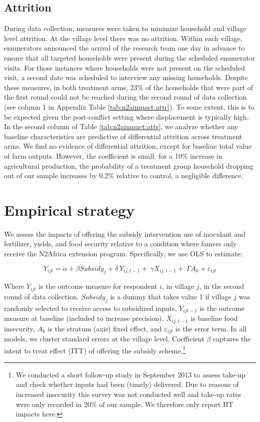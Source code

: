 \subsection{Attrition}
During data collection, measures were taken to minimize household and village level attrition. At the village level there was no attrition. Within each village, enumerators announced the arrival of the research team one day in advance to ensure that all targeted households were present during the scheduled enumerator visits. For those instances where households were not present on the scheduled visit, a second date was scheduled to interview any missing households. Despite these measures, in both treatment arms, 23\% of the households that were part of the first round could not be reached during the second round of data collection (see column 1 in Appendix Table \ref{tab:n2aimpact:attr}). To some extent, this is to be expected given the post-conflict setting where displacement is typically high. In the second column of Table \ref{tab:n2aimpact:attr}, we analyze whether any baseline characteristics are predictive of differential attrition across treatment arms. We find no evidence of differential attrition, except for baseline total value of farm outputs. However, the coefficient is small: for a 10\% increase in agricultural production, the probability of a treatment group household dropping out of our sample increases by 0.2\% relative to control, a negligible difference. 

\section{Empirical strategy} 
We assess the impacts of offering the subsidy intervention use of inoculant and fertilizer, yields, and food security relative to a condition where famers only receive the N2Africa extension program.  Specifically, we use OLS to estimate:

\begin{equation}
	\label{eq:n2a:basic}
	Y_{ijt}=\alpha+{\beta Subsidy}_j+{\delta\ Y}_{ij,t-1}+\ \gamma X_{ij,t-1}+\ \Gamma A_k+\varepsilon_{ijt}
\end{equation}

Where $Y_{ijt}$ is the outcome measure for respondent $i$, in village $j$, in the second round of data collection. ${Subsidy}_j$ is a dummy that takes value 1 if village $j$ was randomly selected to receive access to subsidized inputs, $Y_{ijt-1}$ is the outcome measure at baseline (included to increase precision), $X_{ij,t-1}$ is baseline food insecurity, $A_k$ is the stratum (axis) fixed effect, and $\varepsilon_{ijt}$ is the error term. In all models, we cluster standard errors at the village level. Coefficient $\beta$ captures the intent to treat effect (ITT) of offering the subsidy scheme.\footnote{We conducted a short follow-up study in September 2013 to assess take-up and check whether inputs had been (timely) delivered.  Due to reasons of increased insecurity this survey was not conducted well and take-up rates were only recorded in 20\% of our sample. We therefore only report IIT impacts here. }

